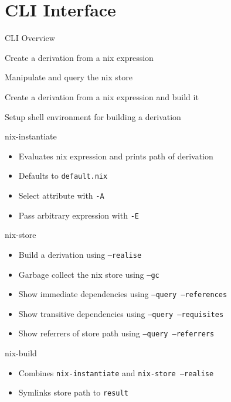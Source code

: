\documentclass{beamer}
\begin{document}
\section{CLI Interface}
\begin{frame}{CLI Overview}
  \begin{description}[leftmargin=!,labelwidth=\widthof{\bfseries nix-instantiate}]
  \item[nix-instantiate]
    Create a derivation from a nix expression

  \item[nix-store]
    Manipulate and query the nix store

  \item[nix-build]
    Create a derivation from a nix expression and build it

  \item[nix-shell]
    Setup shell environment for building a derivation
  \end{description}
\end{frame}

\begin{frame}{nix-instantiate}
  \begin{itemize}
  \item Evaluates nix expression and prints path of derivation
  \item Defaults to \texttt{default.nix}
  \item Select attribute with \texttt{-A}
  \item Pass arbitrary expression with \texttt{-E}
  \end{itemize}
\end{frame}

\begin{frame}{nix-store}
  \begin{itemize}
  \item Build a derivation using \texttt{--realise}
  \item Garbage collect the nix store using \texttt{--gc}
  \item Show immediate dependencies using \texttt{--query --references}
  \item Show transitive dependencies using \texttt{--query --requisites}
  \item Show referrers of store path using \texttt{--query --referrers}
  \end{itemize}
\end{frame}

\begin{frame}{nix-build}
  \begin{itemize}
  \item Combines \texttt{nix-instantiate} and \texttt{nix-store --realise}
  \item Symlinks store path to \texttt{result}
  \end{itemize}
\end{frame}
\end{document}
